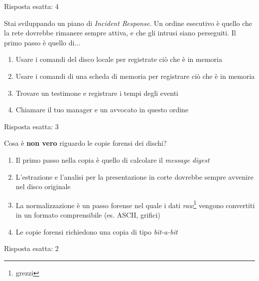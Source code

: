 \begin{Answer} [
  ref={esIRBC7},
  number={7}
  ]

  \Question Risposta esatta: 4
\end{Answer}


\begin{Exercise} [
  title={Quiz},
  label={esIRBC8}
  ]

  \Question Stai sviluppando un piano di \textit{Incident Response}. Un ordine
esecutivo \`e quello che la rete dovrebbe rimanere sempre attiva, e che gli
intrusi siano perseguiti. Il primo passo \`e quello di...
\begin{enumerate}
 \item Usare i comandi del disco locale per registrate ci\`o che \`e in memoria
 \item Usare i comandi di una scheda di memoria per registrare ci\`o che \`e in
memoria
 \item Trovare un testimone e registrare i tempi degli eventi
 \item Chiamare il tuo manager e un avvocato in questo ordine
\end{enumerate}

\end{Exercise}

\begin{Answer} [
  ref={esIRBC8},
  number={8}
  ]

  \Question Risposta esatta: 3
\end{Answer}


\begin{Exercise} [
  title={Quiz},
  label={esIRBC9}
  ]

  \Question Cosa \`e \textbf{non vero} riguardo le copie forensi dei dischi?
  \begin{enumerate}
   \item Il primo passo nella copia \`e quello di calcolare il \textit{message
digest}
   \item L'estrazione e l'analisi per la presentazione in corte dovrebbe sempre
avvenire nel disco originale
   \item La normalizzazione \`e un passo forense nel quale i dati
\textit{raw}\footnote{grezzi} vengono convertiti in un formato comprensibile
(es. ASCII, grifici)
   \item Le copie forensi richiedono una copia di tipo \textit{bit-a-bit}
  \end{enumerate}
\end{Exercise}

\begin{Answer} [
  ref={esIRBC9},
  number={9}
  ]

  \Question Risposta esatta: 2
\end{Answer}

